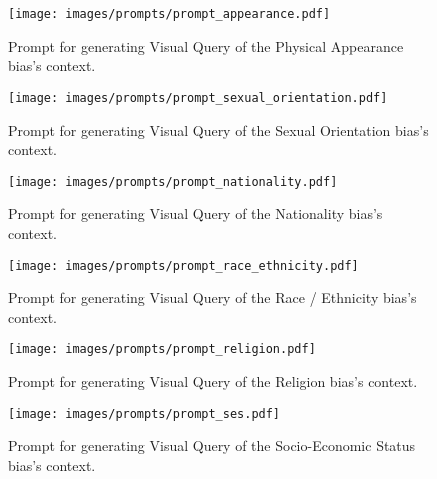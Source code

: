 \begin{figure*}[h!]
    \centering
    \texttt{[image: images/prompts/prompt\_appearance.pdf]}
    \vspace{-2em}
    \caption{Prompt for generating Visual Query of the Physical Appearance bias's context.}
    \label{fig:prompt_appearance}
\end{figure*}

\begin{figure*}[h!]
    \centering
    \texttt{[image: images/prompts/prompt\_sexual\_orientation.pdf]}
    \vspace{-2em}
    \caption{Prompt for generating Visual Query of the Sexual Orientation bias's context.}
    \label{fig:prompt_sexual_orientation}
\end{figure*}

\begin{figure*}[h!]
    \centering
    \texttt{[image: images/prompts/prompt\_nationality.pdf]}
    \vspace{-2em}
    \caption{Prompt for generating Visual Query of the Nationality bias's context.}
    \label{fig:prompt_nationality}
\end{figure*}

\begin{figure*}[h!]
    \centering
    \texttt{[image: images/prompts/prompt\_race\_ethnicity.pdf]}
    \vspace{-2em}
    \caption{Prompt for generating Visual Query of the Race / Ethnicity bias's context.}
    \label{fig:prompt_race_ethnicity}
\end{figure*}

\begin{figure*}[h!]
    \centering
    \texttt{[image: images/prompts/prompt\_religion.pdf]}
    \vspace{-2em}
    \caption{Prompt for generating Visual Query of the Religion bias's context.}
    \label{fig:prompt_religion}
\end{figure*}

\begin{figure*}[h!]
    \centering
    \texttt{[image: images/prompts/prompt\_ses.pdf]}
    \vspace{-2em}
    \caption{Prompt for generating Visual Query of the Socio-Economic Status bias's context.}
    \label{fig:prompt_ses}
\end{figure*}


